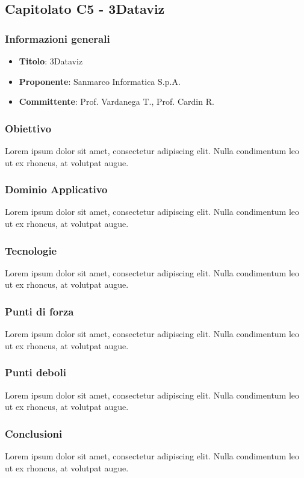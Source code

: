 \subsection{Capitolato C5 - 3Dataviz}
     \subsubsection{Informazioni generali}
        \begin{itemize}
            \item \textbf{Titolo}: 3Dataviz
            \item \textbf{Proponente}: Sanmarco Informatica S.p.A.
            \item \textbf{Committente}: Prof. Vardanega T., Prof. Cardin R.
        \end{itemize}
     \subsubsection{Obiettivo}
    Lorem ipsum dolor sit amet, consectetur adipiscing elit. Nulla condimentum leo ut ex rhoncus, at volutpat augue.
     \subsubsection{Dominio Applicativo}
    Lorem ipsum dolor sit amet, consectetur adipiscing elit. Nulla condimentum leo ut ex rhoncus, at volutpat augue.
    \subsubsection{Tecnologie}
    Lorem ipsum dolor sit amet, consectetur adipiscing elit. Nulla condimentum leo ut ex rhoncus, at volutpat augue.
    \subsubsection{Punti di forza}
    Lorem ipsum dolor sit amet, consectetur adipiscing elit. Nulla condimentum leo ut ex rhoncus, at volutpat augue.
    \subsubsection{Punti deboli}
    Lorem ipsum dolor sit amet, consectetur adipiscing elit. Nulla condimentum leo ut ex rhoncus, at volutpat augue.
    \subsubsection{Conclusioni}
    Lorem ipsum dolor sit amet, consectetur adipiscing elit. Nulla condimentum leo ut ex rhoncus, at volutpat augue.